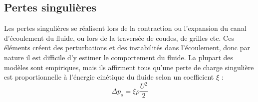 \subsection{Pertes singulières}
Les pertes singulières se réalisent lors de la contraction ou l’expansion du canal d’écoulement du fluide, ou lors de la traversée de coudes, de grilles etc. Ces éléments créent des perturbations et des instabilités dans l'écoulement, donc par nature il est difficile d'y estimer le comportement du fluide. La plupart des modèles sont empiriques, mais ils affirment tous qu’une perte de charge singulière est proportionnelle à l’énergie cinétique du fluide selon un coefficient $\xi$ :
%
\begin{equation}
    \Delta p_s = \xi \rho \frac{U^2}{2}
\end{equation}

